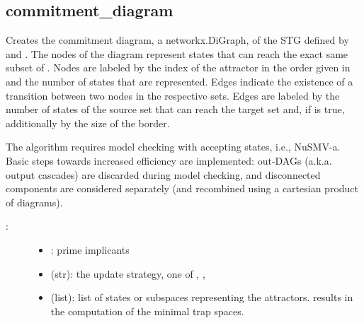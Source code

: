 \documentclass[letterpaper,10pt,english]{sphinxmanual}
\begin{document}
\subsection{commitment\_diagram}
\label{\detokenize{Basins:id6}}\label{\detokenize{Basins:commitment-diagram}}

\begin{fulllineitems}
\label{\detokenize{Basins:PyBoolNet.Basins.commitment_diagram}}
Creates the commitment diagram, a networkx.DiGraph, of the STG defined by  and .
The nodes of the diagram represent states that can reach the exact same subset of .
Nodes are labeled by the index of the attractor in the order given in  and the number of states
that are represented. Edges indicate the existence of a transition between two nodes in the respective sets.
Edges are labeled by the number of states of the source set that can reach the target set and,
if  is true, additionally by the size of the border.

The algorithm requires model checking with accepting states, i.e., NuSMV-a.
Basic steps towards increased efficiency are implemented:
out-DAGs (a.k.a. output cascades) are discarded during model checking, and
disconnected components are considered separately (and recombined using a cartesian product of diagrams).
\begin{description}
\item[{:}] \leavevmode\begin{itemize}
\item {} 
: prime implicants

\item {} 
 (str): the update strategy, one of , , 

\item {} 
 (list): list of states or subspaces representing the attractors.  results in the computation of the minimal trap spaces.


\end{itemize}
\end{description}
\end{fulllineitems}
\end{document}
